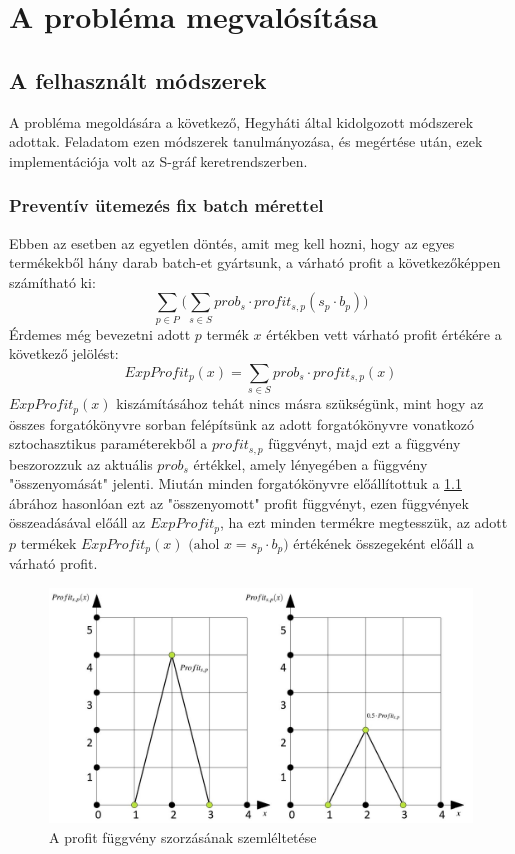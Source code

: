 \chapter{A probléma megvalósítása}
\section{A felhasznált módszerek} \label{math_modells}
A probléma megoldására a következő, Hegyháti által kidolgozott \cite{phd_Hegyhati} módszerek adottak. Feladatom ezen módszerek tanulmányozása, és megértése után, ezek implementációja volt az S-gráf keretrendszerben.
\subsection{Preventív ütemezés fix batch mérettel} \label{FixBatchSize}
Ebben az esetben az egyetlen döntés, amit meg kell hozni, hogy az egyes termékekből hány darab batch-et gyártsunk, a várható profit a következőképpen számítható ki:
$$\sum_{p \in P}\bigg (\sum_{s \in S} prob_s \cdot profit_{s,p} (s_p \cdot b_p)\bigg)$$
Érdemes még bevezetni adott $p$ termék $x$ értékben vett várható profit értékére a következő jelölést:
$$ExpProfit_p(x)=\sum_{s \in S}prob_s \cdot profit_{s,p}(x)$$
$ExpProfit_p(x)$ kiszámításához tehát nincs másra szükségünk, mint hogy az összes forgatókönyvre sorban felépítsünk az adott forgatókönyvre vonatkozó sztochasztikus paraméterekből a $profit_{s,p}$ függvényt, majd ezt a függvény beszorozzuk az aktuális $prob_s$ értékkel, amely lényegében a függvény "összenyomását" jelenti. Miután minden forgatókönyvre előállítottuk a \ref{profit_func_prob} ábrához hasonlóan ezt az "összenyomott" profit függvényt, ezen függvények összeadásával előáll az $ExpProfit_p$, ha ezt minden termékre megtesszük, az adott $p$ termékek $ExpProfit_p(x) \text{ (ahol }x=s_p \cdot b_p)$ értékének összegeként előáll a várható profit.
\begin{figure}[H]
\begin{center}
\includegraphics[scale=0.4]{profit_func_prob}
\caption{A profit függvény szorzásának szemléltetése}
\label{profit_func_prob}
\end{center}
\end{figure}
